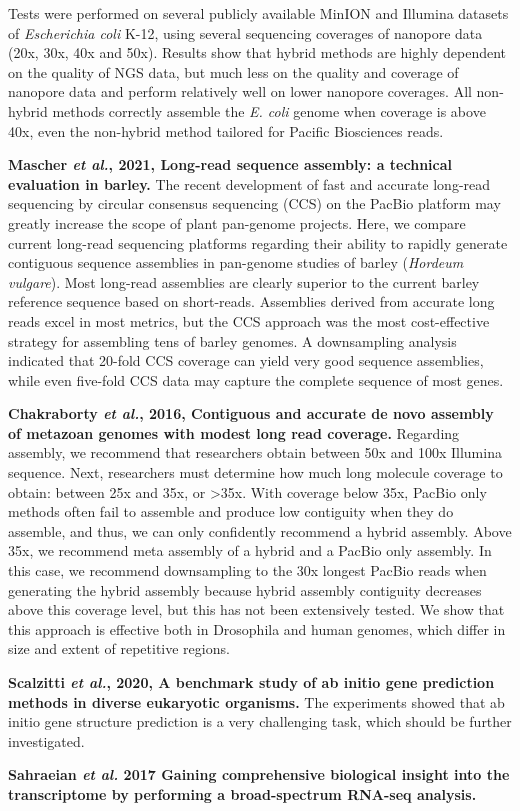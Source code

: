 \documentclass[11pt]{article}
\begin{document}
\begin{sloppypar}
Tests were performed on several publicly available MinION and Illumina datasets of \textit{Escherichia coli} K-12, using several sequencing coverages of nanopore data (20x, 30x, 40x and 50x). 
Results show that hybrid methods are highly dependent on the quality of NGS data, but much less on the quality and coverage of nanopore data and perform relatively well on lower nanopore coverages. 
All non-hybrid methods correctly assemble the \textit{E. coli} genome when coverage is above 40x, even the non-hybrid method tailored for Pacific Biosciences reads. 
\par
\textbf{Mascher \textit{et al.}, 2021, Long-read sequence assembly: a technical evaluation in barley.} \newline
The recent development of fast and accurate long-read sequencing by circular consensus sequencing (CCS) on the PacBio platform may greatly increase the scope of plant pan-genome projects. 
Here, we compare current long-read sequencing platforms regarding their ability to rapidly generate contiguous sequence assemblies in pan-genome studies of barley (\textit{Hordeum vulgare}). 
Most long-read assemblies are clearly superior to the current barley reference sequence based on short-reads. 
Assemblies derived from accurate long reads excel in most metrics, but the CCS approach was the most cost-effective strategy for assembling tens of barley genomes. 
A downsampling analysis indicated that 20-fold CCS coverage can yield very good sequence assemblies, while even five-fold CCS data may capture the complete sequence of most genes. 
\par
\textbf{Chakraborty \textit{et al.}, 2016, Contiguous and accurate de novo assembly of metazoan genomes with modest long read coverage.} \newline
Regarding assembly, we recommend that researchers obtain between 50x and 100x Illumina sequence. 
Next, researchers must determine how much long molecule coverage to obtain: between 25x and 35x, or >35x. 
With coverage below 35x, PacBio only methods often fail to assemble and produce low contiguity when they do assemble, and thus, we can only confidently recommend a hybrid assembly. 
Above 35x, we recommend meta assembly of a hybrid and a PacBio only assembly. 
In this case, we recommend downsampling to the 30x longest PacBio reads when generating the hybrid assembly because hybrid assembly contiguity decreases above this coverage level, but this has not been extensively tested. 
We show that this approach is effective both in Drosophila and human genomes, which differ in size and extent of repetitive regions.
\par
\textbf{Scalzitti \textit{et al.}, 2020, A benchmark study of ab initio gene prediction methods in diverse eukaryotic organisms.} \newline
The experiments showed that ab initio gene structure prediction is a very challenging task, which should be further investigated. 
\par
\textbf{Sahraeian \textit{et al.} 2017 Gaining comprehensive biological insight into the transcriptome by performing a broad-spectrum RNA-seq analysis.} \newline


\end{sloppypar}
\end{document}
